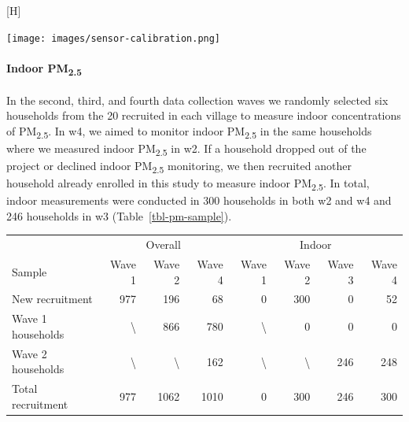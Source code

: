 \documentclass[
  letterpaper,
  DIV=11,
  numbers=noendperiod]{scrartcl}
\makeatletter
\let\oldparagraph\paragraph
\renewcommand{\paragraph}[1]{\oldparagraph{#1}\mbox{}}
\renewenvironment{table}%
   {\renewcommand\familydefault\sfdefault
    \@float{table}}
   {\end@float}
\renewenvironment{figure}%
   {\renewcommand\familydefault\sfdefault
    \@float{figure}}
   {\end@float}
\makeatother
\begin{document}
\begin{figure}[H]

{\centering \texttt{[image: images/sensor-calibration.png]}

}

\caption{\label{fig-calibration}Calibration of real-time sensors against
a reference monitor at University of the Chinese Academy of Sciences.}

\end{figure}

\hypertarget{indoor-pm2.5}{%
\paragraph{\texorpdfstring{Indoor
PM\textsubscript{2.5}}{Indoor PM2.5}}\label{indoor-pm2.5}}

In the second, third, and fourth data collection waves we randomly
selected six households from the 20 recruited in each village to measure
indoor concentrations of PM\textsubscript{2.5}. In w4, we aimed to
monitor indoor PM\textsubscript{2.5} in the same households where we
measured indoor PM\textsubscript{2.5} in w2. If a household dropped out
of the project or declined indoor PM\textsubscript{2.5} monitoring, we
then recruited another household already enrolled in this study to
measure indoor PM\textsubscript{2.5}. In total, indoor measurements were
conducted in 300 households in both w2 and w4 and 246 households in w3
(Table~\ref{tbl-pm-sample}).

\hypertarget{tbl-pm-sample}{}
\begin{table}
\caption{\label{tbl-pm-sample}Household recruitment for overall and indoor air quality measurements. }\tabularnewline

\centering
\begin{tabular}{lrrrrrrr}
\toprule
\multicolumn{1}{c}{ } & \multicolumn{3}{c}{Overall} & \multicolumn{4}{c}{Indoor} \\
\cmidrule(l{3pt}r{3pt}){2-4} \cmidrule(l{3pt}r{3pt}){5-8}
Sample & Wave 1 & Wave 2 & Wave 4 & Wave 1 & Wave 2 & Wave 3 & Wave 4\\
\midrule
New recruitment & 977 & 196 & 68 & 0 & 300 & 0 & 52\\
Wave 1 households & \textbackslash{} & 866 & 780 & \textbackslash{} & 0 & 0 & 0\\
Wave 2 households & \textbackslash{} & \textbackslash{} & 162 & \textbackslash{} & \textbackslash{} & 246 & 248\\
Total recruitment & 977 & 1062 & 1010 & 0 & 300 & 246 & 300\\
\bottomrule
\end{tabular}
\end{table}
\end{document}
